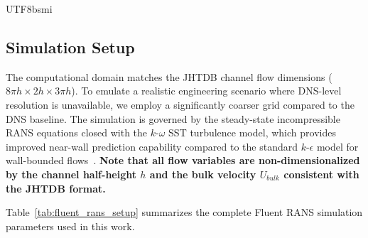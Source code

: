 \documentclass[master]{NTHUthesis}
\begin{document}
\begin{CJK*}{UTF8}{bsmi}
\subsection{Simulation Setup}
The computational domain matches the JHTDB channel flow dimensions ($8\pi h \times 2h \times 3\pi h$).
To emulate a realistic engineering scenario where DNS-level resolution is unavailable, we employ a significantly coarser grid compared to the DNS baseline.
The simulation is governed by the steady-state incompressible RANS equations closed with the $k$-$\omega$ SST turbulence model, which provides improved near-wall prediction capability compared to the standard $k$-$\epsilon$ model for wall-bounded flows~\cite{Menter1994}.
\textbf{Note that all flow variables are non-dimensionalized by the channel half-height $h$ and the bulk velocity $U_{bulk}$ consistent with the JHTDB format.}

Table~\ref{tab:fluent_rans_setup} summarizes the complete Fluent RANS simulation parameters used in this work.


\end{CJK*}
\end{document}
